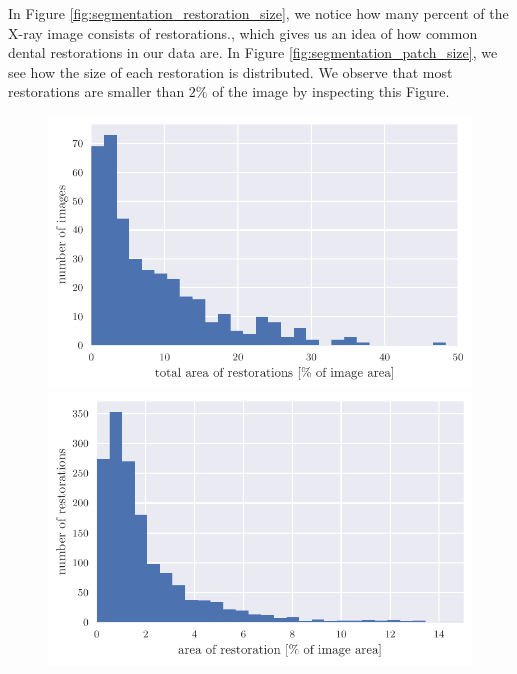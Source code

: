 In Figure \ref{fig:segmentation_restoration_size}, we notice how many percent of the X-ray image consists of restorations., which  gives us an idea of how common dental restorations in our data are. In Figure \ref{fig:segmentation_patch_size}, we see how the size of each restoration is distributed. We observe that most restorations are smaller than $2\%$ of the image by inspecting this Figure.

\begin{figure}
    \centering
    \begin{floatrow}[2]
        {\includegraphics[width=\linewidth]{images/histogram_of_restoration_size.pdf}}\;
        {\includegraphics[width=\linewidth]{images/histogram_of_patch_size.pdf}}
    \end{floatrow}
\end{figure}